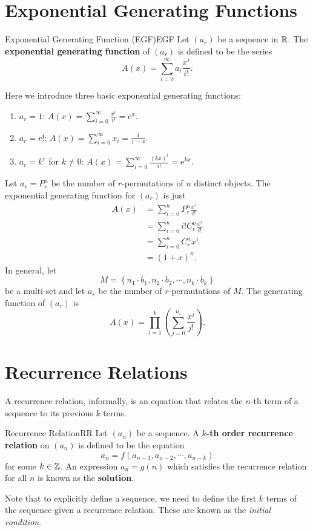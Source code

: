 \documentclass[math]{amznotes}
\theoremstyle{remark}
\newcommand{\e}{\mathrm{e}}
\begin{document}
\section{Exponential Generating Functions}
\begin{dfnbox}{Exponential Generating Function (EGF)}{EGF}
    Let $(a_r)$ be a sequence in $\mathbb{R}$. The {\color{red} \textbf{exponential generating function}} of $(a_r)$ is defined to be the series
    \begin{equation*}
        A(x) = \sum_{i = 0}^{\infty}a_i\frac{x^i}{i!}.
    \end{equation*}
\end{dfnbox}
Here we introduce three basic exponential generating functions:
\begin{enumerate}
    \item $a_r = 1$: $A(x) = \sum_{i = 0}^{\infty}\frac{x^i}{i!} = \e^x$.
    \item $a_r = r!$: $A(x) = \sum_{i = 0}^{\infty}x_i = \frac{1}{1 - x}$.
    \item $a_r = k^r$ for $k \neq 0$: $A(x) = \sum_{i = 0}^{\infty}\frac{(kx)^i}{i!} = \e^{kx}$.
\end{enumerate}
Let $a_r = P^n_r$ be the number of $r$-permutations of $n$ distinct objects. The exponential generating function for $(a_r)$ is just 
\begin{align*}
    A(x) & = \sum_{i = 0}^{n}P^n_r\frac{x^i}{i!} \\
    & = \sum_{i = 0}^{n}i!C^n_r\frac{x^i}{i!} \\
    & = \sum_{i = 0}^{n}C^n_rx^i \\
    & = (1 + x)^n.
\end{align*}
In general, let 
\begin{equation*}
    M = \left\{n_1 \cdot b_1, n_2 \cdot b_2, \cdots, n_k \cdot b_k\right\}
\end{equation*}
be a multi-set and let $a_r$ be the number of $r$-permutations of $M$. The generating function of $(a_r)$ is
\begin{equation*}
    A(x) = \prod_{i = 1}^{k}\left(\sum_{j = 0}^{n_i}\frac{x^j}{j!}\right).
\end{equation*}
\section{Recurrence Relations}
A recurrence relation, informally, is an equation that relates the $n$-th term of a sequence to its previous $k$ terms.
\begin{dfnbox}{Recurrence Relation}{RR}
    Let $(a_n)$ be a sequence. A {\color{red} \textbf{$k$-th order recurrence relation}} on $(a_n)$ is defined to be the equation
    \begin{equation*}
        a_n = f(a_{n - 1}, a_{n - 2}, \cdots, a_{n - k})
    \end{equation*}
    for some $k \in \mathbb{Z}$. An expression $a_n = g(n)$ which satisfies the recurrence relation for all $n$ is known as the {\color{red} \textbf{solution}}. 
\end{dfnbox}
Note that to explicitly define a sequence, we need to define the first $k$ terms of the sequence given a recurrence relation. These are known as the \textit{initial condition}.
\end{document}
